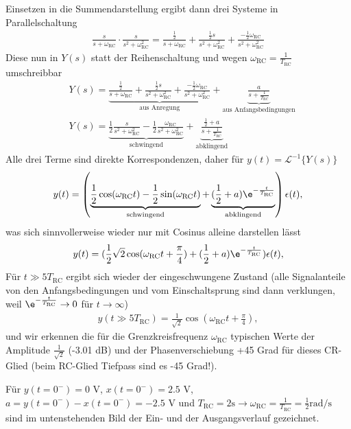 \begin{Loesung}
Einsetzen in die Summendarstellung ergibt dann drei Systeme in Parallelschaltung
\begin{align}
\frac{s}{s + \omega_\text{RC}} \cdot \frac{s}{s^2+\omega_\text{RC}^2} =
\frac{\frac{1}{2}}{s + \omega_\text{RC}} + \frac{\frac{1}{2}s}{s^2+\omega_\text{RC}^2} + \frac{-\frac{1}{2} \omega_\mathrm{RC}}{s^2+\omega_\text{RC}^2}
\end{align}
Diese nun in $Y(s)$ statt der Reihenschaltung und wegen $\omega_\text{RC} = \frac{1}{T_\text{RC}}$ umschreibbar
\begin{align}
&Y(s) = \underbrace{\frac{\frac{1}{2}}{s + \omega_\text{RC}} + \frac{\frac{1}{2}s}{s^2+\omega_\text{RC}^2} + \frac{-\frac{1}{2} \omega_\mathrm{RC}}{s^2+\omega_\text{RC}^2}}_{\text{aus Anregung}} + \underbrace{\frac{a}{s + \frac{1}{T_\text{RC}}}}_{\text{aus Anfangsbedingungen}}\\
&Y(s) = \underbrace{\frac{1}{2}\frac{s}{s^2+\omega_\text{RC}^2} - \frac{1}{2}\frac{\omega_\mathrm{RC}}{s^2+\omega_\text{RC}^2}}_{\text{schwingend}} +
\underbrace{\frac{\frac{1}{2}+a}{s + \frac{1}{T_\text{RC}}}}_{\text{abklingend}}
\end{align}
Alle drei Terme sind direkte Korrespondenzen, daher für $y(t)=\mathcal{L}^{-1}\{Y(s)\}$
\begin{align}
y(t) = \left(\underbrace{\frac{1}{2}\cos(\omega_\text{RC} t) - \frac{1}{2}\sin(\omega_\text{RC} t)}_{\text{schwingend}} + \underbrace{(\frac{1}{2}+a) \e^{-\frac{t}{T_\text{RC}}}}_{\text{abklingend}}\right)\epsilon(t),
\end{align}
was sich sinnvollerweise wieder nur mit Cosinus alleine darstellen lässt
\begin{align}
y(t) = (\frac{1}{2} \sqrt{2}\cos(\omega_\text{RC} t + \frac{\pi}{4}) + (\frac{1}{2}+a) \e^{-\frac{t}{T_\text{RC}}})\epsilon(t),
\end{align}
Für $t\gg 5 T_\text{RC}$ ergibt sich wieder der eingeschwungene Zustand (alle Signalanteile von den Anfangsbedingungen und vom Einschaltsprung sind dann verklungen, weil
$\e^{-\frac{t}{T_\text{RC}}}\rightarrow 0$ für $t\rightarrow \infty$)
\begin{align}
y(t \gg 5 T_\text{RC}) = \frac{1}{\sqrt{2}} \cos(\omega_\text{RC} t + \frac{\pi}{4}),
\end{align}
und wir erkennen die für die Grenzkreisfrequenz $\omega_\text{RC}$ typischen Werte
der Amplitude $\frac{1}{\sqrt{2}}$ (-3.01 dB) und der Phasenverschiebung +45 Grad
für dieses CR-Glied (beim RC-Glied Tiefpass sind es -45 Grad!).

Für $y(t=0^-) = 0$ V, $x(t=0^-) = 2.5$ V, $a = y(t=0^-) - x(t=0^-) = -2.5$ V und $T_\text{RC} = 2 \text{s} \rightarrow \omega_\text{RC} = \frac{1}{T_\text{RC}} = \frac{1}{2} \text{rad/s}$ sind im untenstehenden Bild der Ein- und der Ausgangsverlauf gezeichnet.
\end{Loesung}

